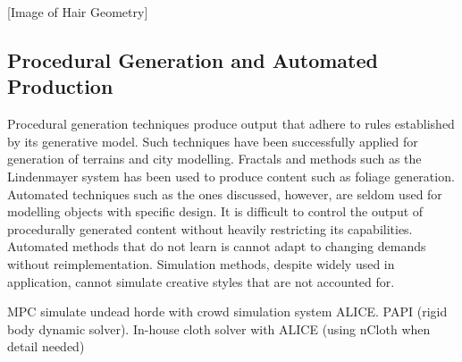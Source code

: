 \documentclass[ %
                    author={Dillon Keith Diep [INCOMPLETE DRAFT, NOT FOR SUBMISSION]},
                supervisor={Dr. Carl Henrik Ek},
                    degree={MEng},
                     title={ART-CG:},
                  subtitle={Assisted Real-Time Content Generation of 3D Hair Geometry},
                      type={Research},
                      year={2014} ]{dissertation}
\begin{document}
[Image of Hair Geometry]

\subsection{Procedural Generation and Automated Production}
{\color{red}

Procedural generation techniques produce output that adhere to rules established by its generative model. Such techniques have been successfully applied for generation of terrains and city modelling. Fractals and methods such as the Lindenmayer system has been used to produce content such as foliage generation. \cite{lsystem} Automated techniques such as the ones discussed, however, are seldom used for modelling objects with specific design. It is difficult to control the output of procedurally generated content without heavily restricting its capabilities. Automated methods that do not learn is cannot adapt to changing demands without reimplementation. Simulation methods, despite widely used in application, cannot simulate creative styles that are not accounted for.
\cite{procedural1}
\cite{procedural2}

MPC simulate undead horde with crowd simulation system ALICE. PAPI (rigid body dynamic solver). In-house cloth solver with ALICE (using nCloth when detail needed)
}
\end{document}
